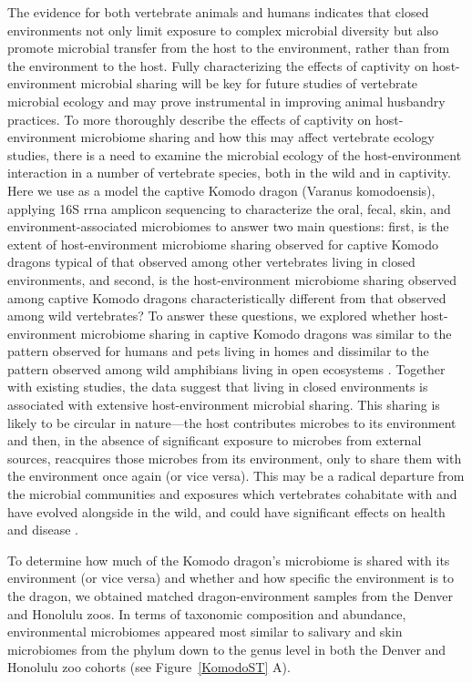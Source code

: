 The evidence for both vertebrate animals and humans indicates that closed
environments not only limit exposure to complex microbial diversity but also
promote microbial transfer from the host to the environment, rather than from
the environment to the host. Fully characterizing the effects of captivity on
host-environment microbial sharing will be key for future studies of vertebrate
microbial ecology and may prove instrumental in improving animal husbandry
practices. To more thoroughly describe the effects of captivity on host-environment
microbiome sharing and how this may affect vertebrate ecology studies, there is a
need to examine the microbial ecology of the host-environment interaction in a
number of vertebrate species, both in the wild and in captivity. Here we use as
a model the captive Komodo dragon (Varanus komodoensis), applying 16S \gls{rrna}
amplicon sequencing to characterize the oral, fecal, skin, and environment-associated
microbiomes to answer two main questions: first, is the extent of host-environment
microbiome sharing observed for captive Komodo dragons typical of that observed
among other vertebrates living in closed environments, and second, is the
host-environment microbiome sharing observed among captive Komodo dragons
characteristically different from that observed among wild vertebrates? To
answer these questions, we explored whether host-environment microbiome sharing
in captive Komodo dragons was similar to the pattern observed for humans and pets
living in homes \cite{Lax2014} and dissimilar to the pattern observed among wild amphibians
living in open ecosystems \cite{Kueneman2014}. Together with existing studies, the data suggest that
living in closed environments is associated with extensive host-environment microbial
sharing. This sharing is likely to be circular in nature—the host contributes
microbes to its environment and then, in the absence of significant exposure to
microbes from external sources, reacquires those microbes from its environment,
only to share them with the environment once again (or vice versa). This may be
a radical departure from the microbial communities and exposures which vertebrates
cohabitate with and have evolved alongside in the wild, and could have significant
effects on health and disease \cite{Lax2015}.

To determine how much of the Komodo dragon's microbiome is shared with its environment
(or vice versa) and whether and how specific the environment is to the dragon, we
obtained matched dragon-environment samples from the Denver and Honolulu zoos. In
terms of taxonomic composition and abundance, environmental microbiomes appeared most
similar to salivary and skin microbiomes from the phylum down to the genus level
in both the Denver and Honolulu zoo cohorts (see Figure~\ref{KomodoST} A).

